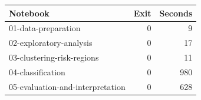 \begin{tabular}{lrr}
\toprule
Notebook & Exit & Seconds \\
\midrule
01-data-preparation & 0 & 9 \\
02-exploratory-analysis & 0 & 17 \\
03-clustering-risk-regions & 0 & 11 \\
04-classification & 0 & 980 \\
05-evaluation-and-interpretation & 0 & 628 \\
\bottomrule
\end{tabular}
